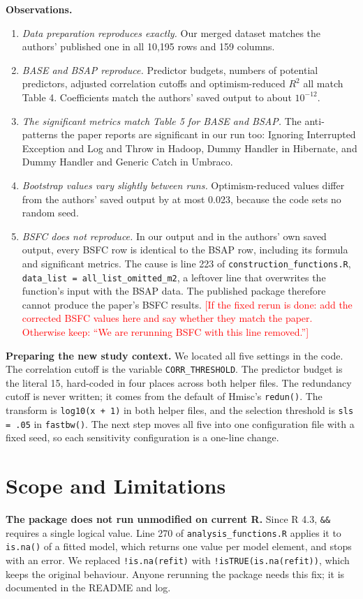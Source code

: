 \documentclass[conference]{IEEEtran}
\newcommand{\todo}[1]{\textcolor{red}{[#1]}}
\begin{document}
\textbf{Observations.}
\begin{enumerate}
\item \emph{Data preparation reproduces exactly.} Our merged dataset matches the authors' published one in all 10,195 rows and 159 columns.
\item \emph{BASE and BSAP reproduce.} Predictor budgets, numbers of potential predictors, adjusted correlation cutoffs and optimism-reduced $R^2$ all match Table 4. Coefficients match the authors' saved output to about $10^{-12}$.
\item \emph{The significant metrics match Table 5 for BASE and BSAP.} The anti-patterns the paper reports are significant in our run too: Ignoring Interrupted Exception and Log and Throw in Hadoop, Dummy Handler in Hibernate, and Dummy Handler and Generic Catch in Umbraco.
\item \emph{Bootstrap values vary slightly between runs.} Optimism-reduced values differ from the authors' saved output by at most 0.023, because the code sets no random seed.
\item \emph{BSFC does not reproduce.} In our output and in the authors' own saved output, every BSFC row is identical to the BSAP row, including its formula and significant metrics. The cause is line 223 of \texttt{construction\_functions.R}, \texttt{data\_list = all\_list\_omitted\_m2}, a leftover line that overwrites the function's input with the BSAP data. The published package therefore cannot produce the paper's BSFC results. \todo{If the fixed rerun is done: add the corrected BSFC values here and say whether they match the paper. Otherwise keep: ``We are rerunning BSFC with this line removed.''}
\end{enumerate}

\textbf{Preparing the new study context.} We located all five settings in the code. The correlation cutoff is the variable \texttt{CORR\_THRESHOLD}. The predictor budget is the literal 15, hard-coded in four places across both helper files. The redundancy cutoff is never written; it comes from the default of Hmisc's \texttt{redun()}. The transform is \texttt{log10(x + 1)} in both helper files, and the selection threshold is \texttt{sls = .05} in \texttt{fastbw()}. The next step moves all five into one configuration file with a fixed seed, so each sensitivity configuration is a one-line change.

\section{Scope and Limitations}
\textbf{The package does not run unmodified on current R.} Since R 4.3, \texttt{\&\&} requires a single logical value. Line 270 of \texttt{analysis\_functions.R} applies it to \texttt{is.na()} of a fitted model, which returns one value per model element, and stops with an error. We replaced \texttt{!is.na(refit)} with \texttt{!isTRUE(is.na(refit))}, which keeps the original behaviour. Anyone rerunning the package needs this fix; it is documented in the README and log.
\end{document}
